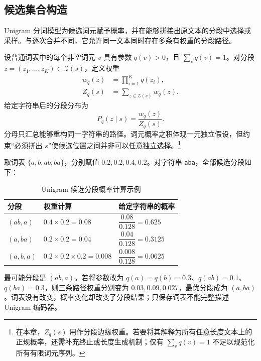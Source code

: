 \documentclass[../textbook.tex]{subfiles}
\begin{document}
\subsection{候选集合构造}
Unigram 分词模型为候选词元赋予概率，并在能够拼接出原文本的分段中选择或采样\cite{kudoSubwordRegularization2018}。与逐次合并不同，它允许同一文本同时存在多条有权重的分段路径。

设普通词表中的每个非空词元 $v$ 具有参数 $q(v)>0$，且 $\sum_vq(v)=1$。对分段 $z=(z_1,\ldots,z_K)\in\mathcal Z(s)$，定义权重
\begin{equation}\label{eq:tok-unigram-weight}
 \begin{aligned}
  w_q(z)&=\prod_{i=1}^{K}q(z_i),\\
  Z_q(s)&=\sum_{z\in\mathcal Z(s)}w_q(z).
 \end{aligned}
\end{equation}
给定字符串后的分段分布为
\begin{equation}
 P_q(z\mid s)=\frac{w_q(z)}{Z_q(s)}.
\end{equation}
分母只汇总能够重构同一字符串的路径。词元概率之积体现一元独立假设，但约束“必须拼出 $s$”使候选位置之间并非可以任意独立选择。\footnote{在本章，$Z_q(s)$ 用作分段边缘权重。若要将其解释为所有任意长度文本上的正规概率，还需补充终止或长度生成机制；仅有 $\sum_vq(v)=1$ 不足以规范化所有有限词元序列。}

\begin{example}
取词表 $\{a,b,ab,ba\}$，分别赋值 $0.2,0.2,0.4,0.2$。对字符串 \texttt{aba}，全部候选分段如下：
\begin{table}[htbp]
\centering
\caption{Unigram 候选分段概率计算示例}
\label{tab:repr-unigram-segments}
{\renewcommand{\arraystretch}{1.8}%
\begin{tabularx}{\linewidth}{@{}lXX@{}}
\toprule 分段 & 权重计算 & 给定字符串的概率\\\midrule
$(ab,a)$ & $0.4\times0.2=0.08$ & $\dfrac{0.08}{0.128}=0.625$\\
$(a,ba)$ & $0.2\times0.2=0.04$ & $\dfrac{0.04}{0.128}=0.3125$\\
$(a,b,a)$ & $0.2\times0.2\times0.2=0.008$ & $\dfrac{0.008}{0.128}=0.0625$\\
\bottomrule
\end{tabularx}}
\end{table}
最可能分段是 $(ab,a)$。若将参数改为 $q(a)=q(b)=0.3$、$q(ab)=0.1$、$q(ba)=0.3$，则三条路径权重分别变为 $0.03,0.09,0.027$，最优分段成为 $(a,ba)$。词表没有改变，概率变化却改变了分段结果；只保存词表不能完整描述 Unigram 编码器。
\end{example}
\end{document}
